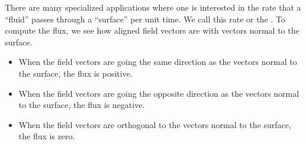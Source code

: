 \documentclass{ximera}
\begin{document}
There are many specialized applications where one is interested in the
rate that a ``fluid'' passes through a ``surface'' per unit time. We
call this rate  or the . To
compute the flux, we see how aligned field vectors are with vectors
normal to the surface.
\begin{itemize}
\item When the field vectors are going the same direction as the
  vectors normal to the surface, the flux is positive.
\item When the field vectors are going the opposite direction as the
  vectors normal to the surface, the flux is negative.
\item When the field vectors are orthogonal to the vectors normal to
  the surface, the flux is zero.
\end{itemize}
\end{document}

